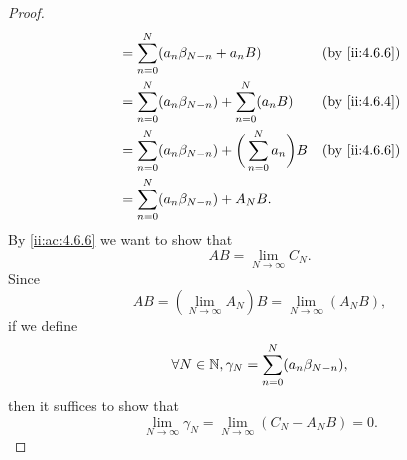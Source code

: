 \begin{proof}
\begin{align*}
                          & = \sum_{n = 0}^N (a_n \beta_{N - n} + a_n B)                            &  & \by{ii:4.6.6} \\
                          & = \sum_{n = 0}^N (a_n \beta_{N - n}) + \sum_{n = 0}^N (a_n B)           &  & \by{ii:4.6.4} \\
                          & = \sum_{n = 0}^N (a_n \beta_{N - n}) + \bigg(\sum_{n = 0}^N a_n\bigg) B &  & \by{ii:4.6.6} \\
                          & = \sum_{n = 0}^N (a_n \beta_{N - n}) + A_N B.
  \end{align*}
  By \cref{ii:ac:4.6.6} we want to show that
  \[
    AB = \lim_{N \to \infty} C_N.
  \]
  Since
  \[
    AB = (\lim_{N \to \infty} A_N) B = \lim_{N \to \infty} (A_N B),
  \]
  if we define
  \[
    \forall N \in \mathbb{N}, \gamma_N = \sum_{n = 0}^N (a_n \beta_{N - n}),
  \]
  then it suffices to show that
  \[
    \lim_{N \to \infty} \gamma_N = \lim_{N \to \infty} (C_N - A_N B) = 0.
  \]


\end{proof}
